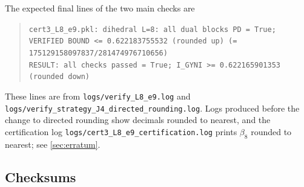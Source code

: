 \documentclass[aps,pra,onecolumn,notitlepage,superscriptaddress,longbibliography,nofootinbib,11pt]{revtex4-2}
\theoremstyle{remark}
\newcommand{\file}[1]{\texttt{#1}}
\begin{document}
The expected final lines of the two main checks are
\begin{quote}
\small
\file{cert3\_L8\_e9.pkl: dihedral L=8: all dual blocks PD = True; VERIFIED BOUND <= 0.622183755532 (rounded up) (= 175129158097837/281474976710656)}\\
\file{RESULT: all checks passed = True;  I\_GYNI >= 0.622165901353 (rounded down)}
\end{quote}
These lines are from \file{logs/verify\_L8\_e9.log} and \file{logs/verify\_strategy\_J4\_directed\_rounding.log}. Logs produced before the change to directed rounding show decimals rounded to nearest, and the certification log \file{logs/cert3\_L8\_e9\_certification.log} prints $\beta_8$ rounded to nearest; see \ref{sec:erratum}.

\subsection{Checksums}
\end{document}
